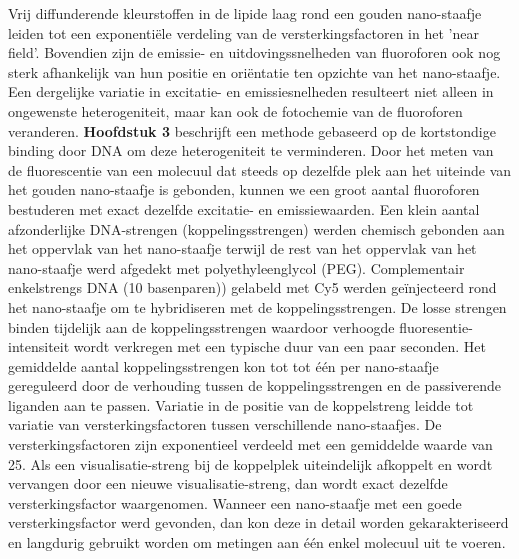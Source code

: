 Vrij diffunderende kleurstoffen in de lipide laag rond een gouden nano-staafje leiden tot een exponentiële verdeling van de versterkingsfactoren in het ’near field’. Bovendien zijn de emissie- en uitdovingssnelheden van fluoroforen ook nog sterk afhankelijk van hun positie en oriëntatie ten opzichte van het nano-staafje. Een dergelijke variatie in excitatie- en emissiesnelheden resulteert niet alleen in ongewenste heterogeniteit, maar kan ook de fotochemie van de fluoroforen veranderen. \textbf{Hoofdstuk 3} beschrijft  een methode gebaseerd op de kortstondige binding door DNA om deze heterogeniteit te verminderen. Door het meten van de fluorescentie van een molecuul dat steeds op dezelfde plek aan het uiteinde van het gouden nano-staafje is gebonden, kunnen we een groot aantal fluoroforen bestuderen met exact dezelfde excitatie- en emissiewaarden. Een klein aantal afzonderlijke DNA-strengen (koppelingsstrengen) werden chemisch gebonden aan het oppervlak van het nano-staafje terwijl de rest van het oppervlak van het nano-staafje werd afgedekt met polyethyleenglycol (PEG). Complementair enkelstrengs DNA (10 basenparen)) gelabeld met Cy5 werden geïnjecteerd rond het nano-staafje om te hybridiseren met de koppelingsstrengen. De losse strengen binden tijdelijk aan de koppelingsstrengen waardoor verhoogde fluoresentie-intensiteit wordt verkregen met een typische duur van een paar seconden. Het gemiddelde aantal koppelingsstrengen kon tot tot één per nano-staafje gereguleerd door de verhouding tussen de koppelingsstrengen en de passiverende liganden aan te passen. Variatie in de positie van de koppelstreng leidde tot variatie van versterkingsfactoren tussen verschillende nano-staafjes. De versterkingsfactoren zijn exponentieel verdeeld met een gemiddelde waarde van 25. Als een visualisatie-streng bij de koppelplek uiteindelijk afkoppelt en wordt vervangen door een nieuwe visualisatie-streng, dan wordt exact dezelfde versterkingsfactor waargenomen. Wanneer een nano-staafje met een goede versterkingsfactor werd gevonden, dan kon deze in detail worden gekarakteriseerd en langdurig gebruikt worden om metingen aan één enkel molecuul uit te voeren.



